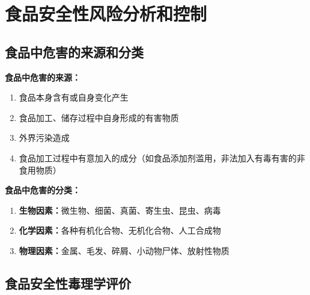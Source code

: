 \chapter{食品安全性风险分析和控制}
\setcounter{chapter}{12}

\section{食品中危害的来源和分类}

\begin{tipbox}
\textbf{食品中危害的来源：}
\begin{enumerate}[leftmargin=*]
    \item 食品本身含有或自身变化产生
    \item 食品加工、储存过程中自身形成的有害物质
    \item 外界污染造成
    \item 食品加工过程中有意加入的成分（如食品添加剂滥用，非法加入有毒有害的非食用物质）
\end{enumerate}

\textbf{食品中危害的分类：}
\begin{enumerate}[leftmargin=*]
    \item \textbf{生物因素：}微生物、细菌、真菌、寄生虫、昆虫、病毒
    \item \textbf{化学因素：}各种有机化合物、无机化合物、人工合成物
    \item \textbf{物理因素：}金属、毛发、碎屑、小动物尸体、放射性物质
\end{enumerate}
\end{tipbox}

\section{食品安全性毒理学评价}

